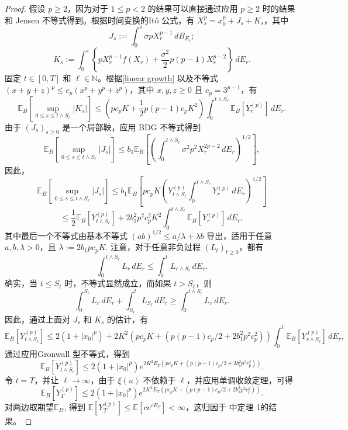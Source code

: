 \begin{proof}
	假设 $p \geq 2$，因为对于 $1 \leq p < 2$ 的结果可以直接通过应用 $p \geq 2$ 时的结果和 Jensen 不等式得到。根据时间变换的Itô 公式，有 $X_s^p = x_0^p + J_s + K_s$，其中
	\[
	J_s := \int_0^s \sigma p X_r^{p-1}  \, dB_{E_r};
	\]
	\[
	K_s := \int_0^s \left\{ p X_r^{p-1} f(X_r) + \frac{\sigma^2}{2} p (p-1) X_r^{p-2}  \right\} \, dE_r.
	\]
	固定 $t \in [0, T]$ 和 $\ell \in \mathbb{N}$。根据\cref{linear growth} 以及不等式 $(x + y + z)^p \leq c_p (x^p + y^p + z^p)$，其中 $x, y, z \geq 0$ 且 $c_p = 3^{p-1}$，有
	\[
	\mathbb{E}_B\left[ \sup_{0 \leq s \leq t \wedge S_{\ell}} |K_s| \right] \leq \left( p c_p K + \frac{1}{2} p(p-1) c_p K^2 \right) \int_0^{t \wedge S_{\ell}} \mathbb{E}_B[Y_r^{(p)}] \, dE_r.
	\]
	由于 $(J_s)_{s \geq 0}$ 是一个局部鞅，应用 BDG 不等式得到
	\[
	\mathbb{E}_B\left[\sup_{0 \leq s \leq t \wedge S_{\ell}} |J_s| \right] \leq b_1 \mathbb{E}_B \left[\left( \int_0^{t \wedge S_{\ell}} \sigma^2 p^2 X_r^{2p-2}  \, dE_r \right)^{1/2}\right],
	\]
	因此，
	\[
	\mathbb{E}_B \left[\sup_{0 \leq s \leq t \wedge S_{\ell}} |J_s| \right] \leq b_1 \mathbb{E}_B \left[ p c_p K \left( Y_{t \wedge S_{\ell}}^{(p)} \int_0^{t \wedge S_{\ell}} Y_r^{(p)} \, dE_r \right)^{1/2} \right]
	\]
	\[
	\leq \frac{1}{2} \mathbb{E}_B \left[Y_{t \wedge S_{\ell}}^{(p)}\right] + 2b_1^2 p^2 c_p^2 K^2 \int_0^{t \wedge S_{\ell}} \mathbb{E}_B \left[Y_r^{(p)}\right] \, dE_r,
	\]
	其中最后一个不等式由基本不等式 $(ab)^{1/2} \leq a/\lambda + \lambda b$ 导出，适用于任意 $a, b, \lambda > 0$，且 $\lambda := 2b_1 p c_p K$. 
	注意，对于任意非负过程 $(L_t)_{t \geq 0}$，都有
	\[
	\int_0^{t \wedge S_{\ell}} L_r \, dE_r \leq \int_0^t L_{r \wedge S_{\ell}} \, dE_r.
	\]
	确实，当 $t \leq S_{\ell}$ 时，不等式显然成立，而如果 $t > S_{\ell}$，则
	\[
	\int_0^{S_{\ell}} L_r \, dE_r + \int_{S_{\ell}}^t L_{S_{\ell}} \, dE_r \geq \int_0^{t \wedge S_{\ell}} L_r \, dE_r.
	\]
	因此，通过上面对 $J_s$ 和 $K_s$ 的估计，有
	\[
	\mathbb{E}_B[Y_{t \wedge S_{\ell}}^{(p)}] \leq 2(1 + |x_0|^p) + 2K^2\left(p c_p K + \left(p(p-1) c_p / 2 + 2b_1^2 p^2 c_p^2\right) \right)\int_0^t \mathbb{E}_B[Y_{r \wedge S_{\ell}}^{(p)}] \, dE_r,
	\]
	通过应用Gronwall 型不等式，得到
	\[
	\mathbb{E}_B[Y_{t \wedge S_{\ell}}^{(p)}] \leq 2(1 + |x_0|^p) e^{2K^2E_T\left(p c_p K + \left(p(p-1) c_p / 2 + 2b_1^2 p^2 c_p^2\right) \right) }.
	\]
	令 $t = T$，并让 $\ell \to \infty$，由于 $\xi(u)$ 不依赖于 $\ell$，并应用单调收敛定理，可得
	\[
	\mathbb{E}_B[Y_T^{(p)}] \leq 2(1 + |x_0|^p) e^{2K^2E_T \left(p c_p K + \left(p(p-1) c_p / 2 + 2b_1^2 p^2 c_p^2\right) \right)}. 
	\]
	对两边取期望$\mathbb{E}_D$, 得到 $\mathbb{E}[Y_T^{(p)}] \leq \mathbb{E}[ce^{cE_T}] < \infty$，这归因于 \cite{jin2019strong}中定理 1的结果。
	
	
	
\end{proof}

